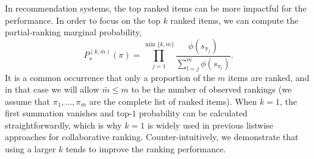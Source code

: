 \documentclass{article}
\begin{document}

In recommendation systems, the top ranked items can be more impactful for the performance.
In order to focus on the top $k$ ranked items, we can compute the partial-ranking marginal probability,
\begin{equation}
\label{eq:topk_prob}
    P^{(k,\bar{m})}_{s}(\pi) = \prod_{j=1}^{\min\{k, \bar{m}\}} \frac{\phi(s_{\pi_j})}{\sum_{l=j}^{\bar{m}} \phi(s_{\pi_l})}.
\end{equation}
It is a common occurrence that only a proportion of the $m$ items are ranked, and in that case we will allow $\bar{m} \le m$ to be the number of observed rankings (we assume that $\pi_1,\ldots,\pi_{\bar{m}}$ are the complete list of ranked items).
When $k=1$, the first summation vanishes and top-$1$ probability can be calculated straightforwardly, which is why $k=1$ is widely used in previous listwise approaches for collaborative ranking. 
Counter-intuitively, we demonstrate that using a larger $k$ tends to improve the ranking performance.
\end{document}
